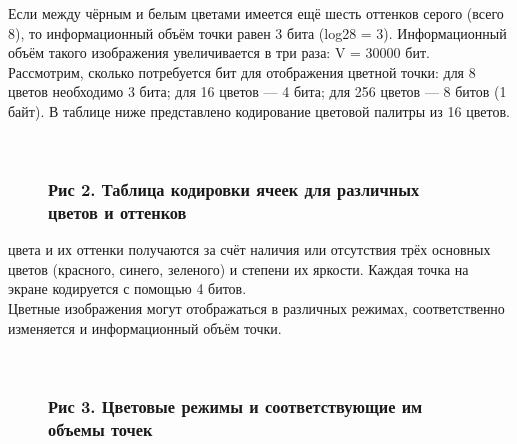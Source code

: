 \documentclass{beamer}
\begin{document}
Если между чёрным и белым цветами имеется ещё шесть оттенков серого (всего  8), то информационный объём точки равен 3 бита (log28 = 3). Информационный объём такого изображения увеличивается в три раза:  V = 30000 бит.\\
 \newpage
Рассмотрим, сколько потребуется бит для отображения цветной точки: для  8  цветов необходимо  3  бита; для  16 цветов —  4  бита; для  256  цветов —  8  битов (1  байт). В таблице ниже представлено кодирование цветовой палитры из  16  цветов.\\
\begin{figure}[H]
\begin{center}
\begin{minipage}[h]{0.7\linewidth}
  \\
\frametitle{ Рис 2. Таблица кодировки ячеек для различных цветов и оттенков}
\end{minipage}
\end{center}
\end{figure}
\newpage
{} цвета и их оттенки получаются за счёт наличия или отсутствия трёх основных цветов (красного, синего, зеленого) и степени их яркости. Каждая точка на экране кодируется с помощью  4  битов.\\
Цветные изображения могут отображаться в различных режимах, соответственно изменяется и информационный объём точки.
\begin{figure}[H]
\begin{center}
\begin{minipage}[h]{1\linewidth}
  \\
\frametitle{ Рис 3. Цветовые режимы и соответствующие им объемы точек}
\end{minipage}
\end{center}
\end{figure}
\end{document}
